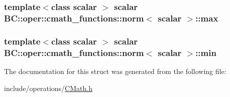\subsubsection[{\texorpdfstring{max}{max}}]{\setlength{\rightskip}{0pt plus 5cm}template$<$class scalar $>$ scalar {\bf B\+C\+::oper\+::cmath\+\_\+functions\+::norm}$<$ scalar $>$\+::max}\hypertarget{structBC_1_1oper_1_1cmath__functions_1_1norm_a7d5ce6bbb0c901d2316eb331bafa9605}{}\label{structBC_1_1oper_1_1cmath__functions_1_1norm_a7d5ce6bbb0c901d2316eb331bafa9605}
\subsubsection[{\texorpdfstring{min}{min}}]{\setlength{\rightskip}{0pt plus 5cm}template$<$class scalar $>$ scalar {\bf B\+C\+::oper\+::cmath\+\_\+functions\+::norm}$<$ scalar $>$\+::min}\hypertarget{structBC_1_1oper_1_1cmath__functions_1_1norm_a37b76407ad8bcdf19d4b3d778a2c9b3c}{}\label{structBC_1_1oper_1_1cmath__functions_1_1norm_a37b76407ad8bcdf19d4b3d778a2c9b3c}


The documentation for this struct was generated from the following file\+:\begin{DoxyCompactItemize}
\item 
include/operations/\hyperlink{CMath_8h}{C\+Math.\+h}\end{DoxyCompactItemize}

